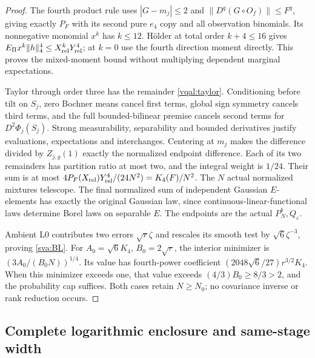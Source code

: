 \begin{proof}
The fourth product rule uses $|G-m_j|\le2$ and
$\|D^q(G\circ O_f)\|\le F^q$, giving exactly $P_F$ with its second
pure $e_4$ copy and all observation binomials. Its nonnegative monomial
$x^k$ has $k\le12$. H\"older at total order $k+4\le16$ gives
$E_\Pi x^k\|h\|_4^4\le X_{\rm rel}^kY_{\rm rel}^4$; at $k=0$ use
the fourth direction moment directly. This proves the mixed-moment
bound without multiplying dependent marginal expectations.

Taylor through order three has the remainder \eqref{vqal:taylor}.
Conditioning before tilt on $S_j$, zero Bochner means cancel first
terms, global sign symmetry cancels third terms, and the full
bounded-bilinear premise cancels second terms for
$D^2\Phi_j(S_j)$. Strong measurability, separability and bounded
derivatives justify evaluations, expectations and interchanges. Centering
at $m_j$ makes the difference divided by $Z_{j,g}(1)$ exactly the
normalized endpoint difference. Each of its two remainders has partition
ratio at most two, and the integral weight is $1/24$. Their sum is at
most $4P_F(X_{\rm rel})Y_{\rm rel}^4/(24N^2)=K_4(F)/N^2$.
The $N$ actual normalized mixtures telescope. The final normalized sum
of independent Gaussian $E$-elements has exactly the original Gaussian
law, since continuous-linear-functional laws determine Borel laws on
separable $E$. The endpoints are the actual $P_N^b,Q_\varepsilon$.

Ambient L0 contributes two errors $\sqrt r\zeta$ and rescales its
smooth test by $\sqrt6\zeta^{-3}$, proving \eqref{sva:BL}.
For $A_0=\sqrt6K_4$, $B_0=2\sqrt r$, the interior minimizer is
$(3A_0/(B_0N))^{1/4}$. Its value has fourth-power coefficient
$(2048\sqrt6/27)r^{3/2}K_4$. When this minimizer exceeds one, that
value exceeds $(4/3)B_0\ge8/3>2$, and the probability cap suffices.
Both cases retain $N\ge N_0$; no covariance inverse or rank reduction
occurs.
\end{proof}

\subsection{Complete logarithmic enclosure and same-stage width}
\label{sva:enclosure}

